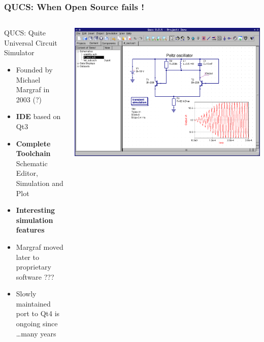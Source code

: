 \begin{frame}
  \frametitle{QUCS: When Open Source fails !}
  \begin{columns}
    \begin{column}{.6\textwidth}
      \centerline{QUCS: Quite Universal Circuit Simulator}
      \begin{itemize}
      \item Founded by Michael Margraf in 2003 {\tiny (?)}
      \item \textbf{IDE} based on Qt3 \\
      \item \textbf{Complete Toolchain} \\
        Schematic Editor, Simulation and Plot
      \item \textbf{Interesting simulation features}
      \item Margraf moved later to proprietary software ???
      \item Slowly maintained \\
        port to Qt4 is ongoing since \ldots many years
      \end{itemize}
    \end{column}
    \begin{column}{.4\textwidth}
      \begin{center}
        \includegraphics[width=1.\textwidth]{images/qucs.png}
      \end{center}
    \end{column}
  \end{columns}
\end{frame}

